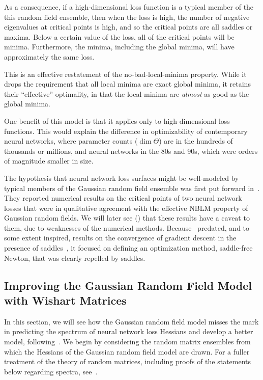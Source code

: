 \documentclass[../../thesis.tex]{subfiles}
\begin{document}
As a consequence, if a high-dimensional loss function is a typical member of the
this random field ensemble, then
when the loss is high,
the number of negative eigenvalues at critical points is high,
and so the critical points are all saddles or maxima.
Below a certain value of the loss,
all of the critical points will be minima.
Furthermore,
the minima, including the global minima,
will have approximately the same loss.

This is an effective restatement
of the no-bad-local-minima property.
While it drops the requirement that all local minima are
exact global minima,
it retains their \enquote{effective} optimality,
in that the local minima are \emph{almost} as good
as the global minima.

One benefit of this model is that it
applies only to high-dimensional loss functions.
This would explain the difference in optimizability
of contemporary neural networks,
where parameter counts ($\dim \Theta$)
are in the hundreds of thousands or millions,
and neural networks in the 80s and 90s,
which were orders of magnitude smaller in size.

The hypothesis that neural network loss surfaces
might be well-modeled by typical members
of the Gaussian random field ensemble
was first put forward in~\cite{dauphin2014}.
They reported numerical results on the critical points
of two neural network losses that were in qualitative
agreement with the effective NBLM property
of Gaussian random fields.
We will later see ()
that these results have a caveat to them,
due to weaknesses of the numerical methods.
Because~\cite{dauphin2014} predated,
and to some extent inspired,
results on the convergence of gradient descent
in the presence of saddles~\cite{lee2016,jin2018a},
it focused on defining an optimization method,
saddle-free Newton,
that was clearly repelled by saddles.

\subsection{Improving the Gaussian Random Field Model with Wishart Matrices}

In this section, we will see
how the Gaussian random field model misses the mark
in predicting the spectrum of neural network loss Hessians
and develop a better model, following~\cite{pennington2017}.
We begin by considering the random matrix ensembles
from which the Hessians of the Gaussian random field model
are drawn.
For a fuller treatment of the theory of random matrices,
including proofs of the statements below regarding spectra,
see~\cite{feier2012,tao2012}.
\end{document}
